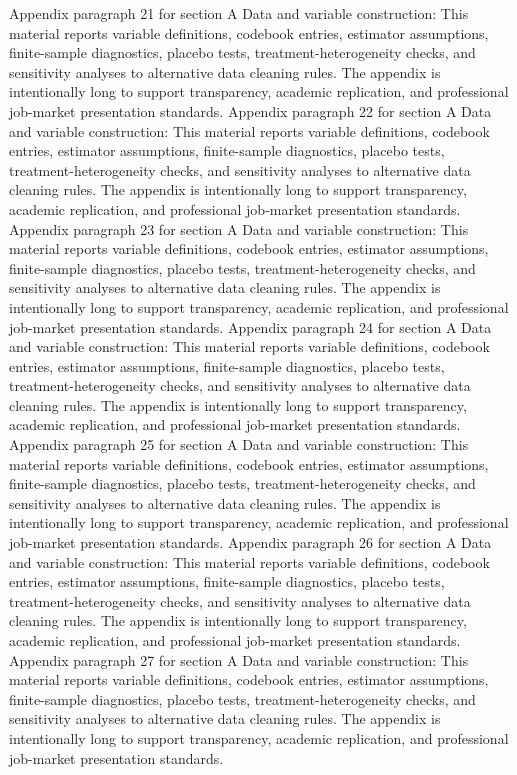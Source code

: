 \documentclass[preprint,12pt]{elsarticle}
\begin{document}
Appendix paragraph 21 for section A Data and variable construction: This material reports variable definitions, codebook entries, estimator assumptions, finite-sample diagnostics, placebo tests, treatment-heterogeneity checks, and sensitivity analyses to alternative data cleaning rules. The appendix is intentionally long to support transparency, academic replication, and professional job-market presentation standards.
Appendix paragraph 22 for section A Data and variable construction: This material reports variable definitions, codebook entries, estimator assumptions, finite-sample diagnostics, placebo tests, treatment-heterogeneity checks, and sensitivity analyses to alternative data cleaning rules. The appendix is intentionally long to support transparency, academic replication, and professional job-market presentation standards.
Appendix paragraph 23 for section A Data and variable construction: This material reports variable definitions, codebook entries, estimator assumptions, finite-sample diagnostics, placebo tests, treatment-heterogeneity checks, and sensitivity analyses to alternative data cleaning rules. The appendix is intentionally long to support transparency, academic replication, and professional job-market presentation standards.
Appendix paragraph 24 for section A Data and variable construction: This material reports variable definitions, codebook entries, estimator assumptions, finite-sample diagnostics, placebo tests, treatment-heterogeneity checks, and sensitivity analyses to alternative data cleaning rules. The appendix is intentionally long to support transparency, academic replication, and professional job-market presentation standards.
Appendix paragraph 25 for section A Data and variable construction: This material reports variable definitions, codebook entries, estimator assumptions, finite-sample diagnostics, placebo tests, treatment-heterogeneity checks, and sensitivity analyses to alternative data cleaning rules. The appendix is intentionally long to support transparency, academic replication, and professional job-market presentation standards.
Appendix paragraph 26 for section A Data and variable construction: This material reports variable definitions, codebook entries, estimator assumptions, finite-sample diagnostics, placebo tests, treatment-heterogeneity checks, and sensitivity analyses to alternative data cleaning rules. The appendix is intentionally long to support transparency, academic replication, and professional job-market presentation standards.
Appendix paragraph 27 for section A Data and variable construction: This material reports variable definitions, codebook entries, estimator assumptions, finite-sample diagnostics, placebo tests, treatment-heterogeneity checks, and sensitivity analyses to alternative data cleaning rules. The appendix is intentionally long to support transparency, academic replication, and professional job-market presentation standards.
\end{document}

